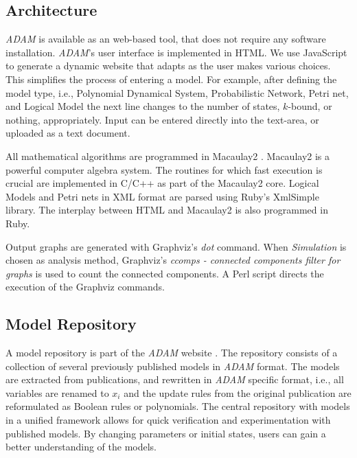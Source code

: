 \documentclass[10pt]{bmc_article}
\newenvironment{bmcformat}{\fussy\setboolean{publ}{true}}{\fussy}
\begin{document}
\begin{bmcformat}

\subsection*{Architecture}
{\it ADAM} is available as an web-based tool, that does not require any software installation. {\it ADAM}'s user interface is implemented in HTML. We use JavaScript to generate a dynamic website that adapts as the user makes various choices. This simplifies the process of entering a model. For example, after defining the model type, i.e., Polynomial Dynamical System, Probabilistic Network, Petri net, and Logical Model the next line changes to the number of states, $k$-bound, or nothing, appropriately. Input can be entered directly into the text-area, or uploaded as a text document.

All mathematical algorithms are programmed in Macaulay2 \cite{M2}. Macaulay2 is a powerful computer algebra system. The routines for which fast execution is crucial are implemented in C/C++ as part of the Macaulay2 core. Logical Models and Petri nets in XML format are parsed using Ruby's XmlSimple library. The interplay between HTML and Macaulay2 is also programmed in Ruby.

Output graphs are generated with Graphviz's {\it dot} command. When {\it Simulation} is chosen as analysis method, Graphviz's {\it ccomps - connected components filter for graphs} is used to count the connected components. A Perl script directs the execution of the Graphviz commands.
\subsection*{Model Repository}
A model repository is part of the {\it ADAM} website \cite{ADAMRepo}. The repository consists of a collection of several previously published models in {\it ADAM} format. The models are extracted from publications, and rewritten in {\it ADAM} specific format, i.e., all variables are renamed to $x_i$ and the update rules from the original publication are reformulated as Boolean rules or polynomials. The central repository with models in a unified framework allows for quick verification and experimentation with published models. By changing parameters or initial states, users can gain a better understanding of the models.


\end{bmcformat}
\end{document}
